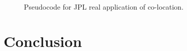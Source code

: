 \documentclass[conference]{IEEEtran}
\begin{document}
\begin{figure}[!ht]
\vspace{0.3in}
\begin{center}
\begin{center}
\mbox{}\\[0.3em]
\end{center}
\hspace{\fill}%
\caption{Pseudocode for JPL real application of co-location.}
\label{code:jobs}
\end{center}
\end{figure}



\section{Conclusion}
\label{sec:conclusion}




\end{document}
